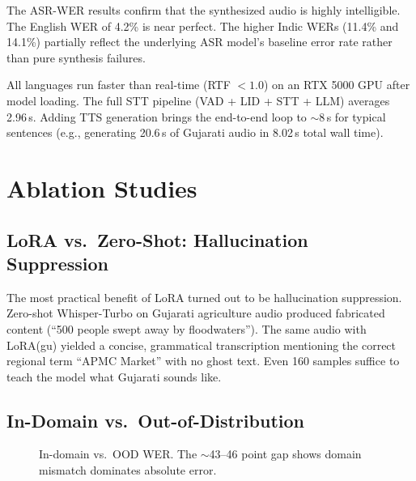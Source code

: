 \documentclass[11pt]{article}
\begin{document}
The ASR-WER results confirm that the synthesized audio is highly intelligible. The English WER of 4.2\% is near perfect. The higher Indic WERs (11.4\% and 14.1\%) partially reflect the underlying ASR model's baseline error rate rather than pure synthesis failures.

All languages run faster than real-time (RTF $<1.0$) on an RTX 5000 GPU after model loading. The full STT pipeline (VAD + LID + STT + LLM) averages 2.96\,s. Adding TTS generation brings the end-to-end loop to $\sim$8\,s for typical sentences (e.g., generating 20.6\,s of Gujarati audio in 8.02\,s total wall time).

\section{Ablation Studies}\label{sec:ablation}

\subsection{LoRA vs.\ Zero-Shot: Hallucination Suppression}

The most practical benefit of LoRA turned out to be hallucination suppression.  Zero-shot Whisper-Turbo on Gujarati agriculture audio produced fabricated content (``500 people swept away by floodwaters'').  The same audio with LoRA(gu) yielded a concise, grammatical transcription mentioning the correct regional term ``APMC Market'' with no ghost text.  Even 160 samples suffice to teach the model what Gujarati sounds like.

\subsection{In-Domain vs.\ Out-of-Distribution}\label{sec:abl_ood}

\begin{figure}[t]
\centering
{}
\caption{In-domain vs.\ OOD WER.  The $\sim$43--46 point gap shows domain mismatch dominates absolute error.}
\label{fig:ood}
\end{figure}
\end{document}

